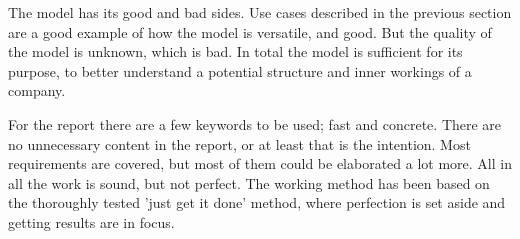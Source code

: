 \documentclass[12pt, a4paper]{article}
\begin{document}
The model has its good and bad sides. Use cases described in the previous
section are a good example of how the model is versatile, and good. But the
quality of the model is unknown, which is bad. In total the model is sufficient
for its purpose, to better understand a potential structure and inner workings
of a company. 

For the report there are a few keywords to be used; fast and concrete. There
are no unnecessary content in the report, or at least that is the intention.
Most requirements are covered, but most of them could be elaborated a lot more. 
All in all the work is sound, but not perfect. The working method has been
based on the thoroughly tested 'just get it done' method, where perfection is
set aside and getting results are in focus.  


\begin{thebibliography}{1}


\end{thebibliography}

%
%
\end{document}
